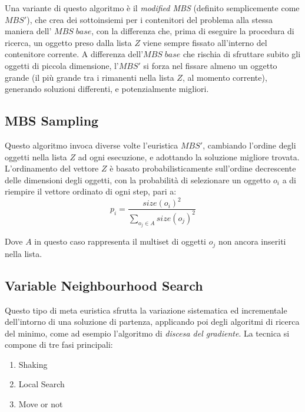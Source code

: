 \documentclass{article}
\begin{document}
\newline
\newline
Una variante di questo algoritmo è il \textit{modified MBS} (definito semplicemente come $MBS'$), che crea dei sottoinsiemi per i contenitori del problema alla stessa maniera dell' $MBS\;base$, con la differenza che, prima di eseguire la procedura di ricerca, un oggetto preso dalla lista $Z$ viene sempre fissato all'interno del contenitore corrente.
\newline
\newline
A differenza dell'$MBS\;base$ che rischia di sfruttare subito gli oggetti di piccola dimensione, l'$MBS'$ si forza nel fissare almeno un oggetto grande (il più grande tra i rimanenti nella lista $Z$, al momento corrente), generando soluzioni differenti, e potenzialmente migliori.
 
\subsection{MBS Sampling}
Questo algoritmo invoca diverse volte l'euristica $MBS'$, cambiando l'ordine degli oggetti nella lista $Z$ ad ogni esecuzione, e adottando la soluzione migliore trovata.
\newline
\newline
L'ordinamento del vettore $Z$ è basato probabilisticamente sull'ordine decrescente delle dimensioni degli oggetti, con la probabilità di selezionare un oggetto $o_i$ a di riempire il vettore ordinato di ogni step, pari a:
\[
p_i = \frac{size(o_i)^{2}}{\sum_{o_{j} \in A }size(o_{j})^{2}}
\]

Dove $A$ in questo caso rappresenta il multiset di oggetti $o_j$ non ancora inseriti nella lista.

\subsection{Variable Neighbourhood Search}

Questo tipo di meta euristica sfrutta la variazione sistematica ed incrementale dell'intorno di una soluzione di partenza, applicando poi degli algoritmi di ricerca del minimo, come ad esempio l'algoritmo di \textit{discesa del gradiente}.
\newline
\newline
La tecnica si compone di tre fasi principali:
\begin{enumerate}
\item Shaking
\item Local Search
\item Move or not
\end{enumerate}
\end{document}
